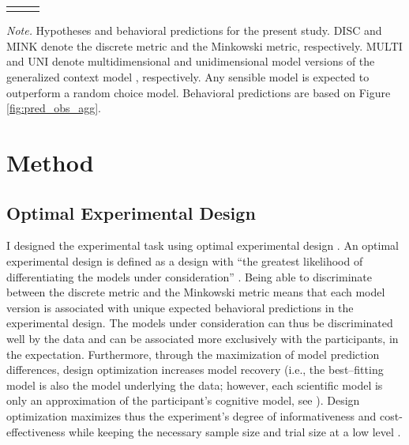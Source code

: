 \documentclass[a4paper,man,natbib]{apa6}
\begin{document}
\begin{table}
\begin{center}
\begin{threeparttable}
\begin{tabular*}{\textwidth}{lp{115mm}p{110mm}}
\bottomrule
\addlinespace
\end{tabular*}
\begin{tablenotes}[para]
\textit{Note.} Hypotheses and behavioral predictions for the present study. DISC and MINK denote the discrete metric and the Minkowski metric, respectively. MULTI and UNI denote multidimensional and unidimensional model versions of the generalized context model \citep{nosofsky1989further}, respectively. Any sensible model is expected to outperform a random choice model. Behavioral predictions are based on Figure \ref{fig:pred_obs_agg}.
\end{tablenotes}
\end{threeparttable}
\end{center}
\end{table}
\vspace{\baselineskip}

\section{Method}

\subsection{Optimal Experimental Design}
I designed the experimental task using optimal experimental design \citep{myung2009optimal}. An optimal experimental design is defined as a design with ``the greatest likelihood of differentiating the models under consideration'' \cite[][p. 500]{myung2009optimal}. Being able to discriminate between the discrete metric and the Minkowski metric means that each model version is associated with unique expected behavioral predictions in the experimental design. The models under consideration can thus be discriminated well by the data and can be associated more exclusively with the participants, in the expectation. Furthermore, through the maximization of model prediction differences, design optimization increases model recovery (i.e., the best--fitting model is also the model underlying the data; however, each scientific model is only an approximation of the participant's cognitive model, see \citealp{myung2009optimal}). 
Design optimization maximizes thus the experiment's degree of informativeness and cost-effectiveness while keeping the necessary sample size and trial size at a low level \citep{cavagnaro2009better, ouyang2016practical, raffert2012optimally, atkinson2007optimum, nelson2005finding}. 
\end{document}
